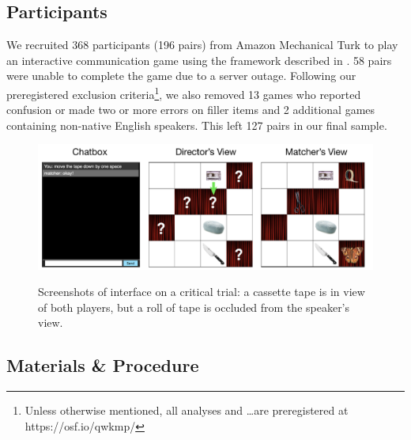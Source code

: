 \documentclass[manuscript]{stjour}
\begin{document}
\subsection{Participants}

We recruited 368 participants (196 pairs) from Amazon Mechanical Turk to play an interactive communication game using the framework described in \cite{Hawkins15_RealTimeWebExperiments}. 58 pairs were unable to complete the game due to a server outage. Following our preregistered exclusion criteria\footnote{Unless otherwise mentioned, all analyses and \dots are preregistered at \textrm{https://osf.io/qwkmp/}}, we also removed 13 games who reported confusion or made two or more errors on filler items and 2 additional games containing non-native English speakers. This left 127 pairs in our final sample. 

\begin{figure}[t!]
 \begin{center}
 \vspace{-.25cm}
 \includegraphics[scale=.38]{figures/Exp1_design.pdf}
 \vspace{-.5cm}
 \caption{Screenshots of interface on a critical trial: a cassette tape is in view of both players, but a roll of tape is occluded from the speaker's view.}
 \vspace{-.5cm}
 \label{fig:exp1paradigm}
 \end{center}
 \end{figure}
 
\subsection{Materials \& Procedure}
\end{document}

